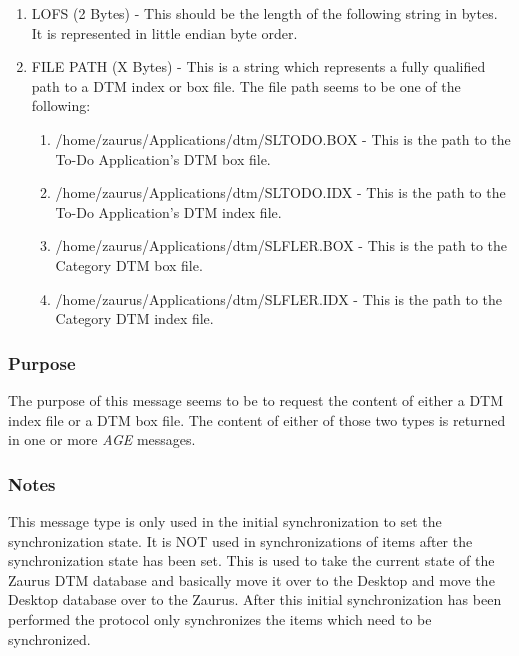             \begin{enumerate}
              \item LOFS (2 Bytes) - This should be the length of the
              following string in bytes. It is represented in little endian
              byte order.

              \item FILE PATH (X Bytes) - This is a string which represents a
              fully qualified path to a DTM index or box file. The file path
              seems to be one of the following:

              \begin{enumerate}
                \item /home/zaurus/Applications/dtm/SLTODO.BOX - This is the
                path to the To-Do Application's DTM box file.

                \item /home/zaurus/Applications/dtm/SLTODO.IDX - This is the
                path to the To-Do Application's DTM index file.

                \item /home/zaurus/Applications/dtm/SLFLER.BOX - This is the
                path to the Category DTM box file.

                \item /home/zaurus/Applications/dtm/SLFLER.IDX - This is the
                path to the Category DTM index file.
              \end{enumerate}
            \end{enumerate}

            \subsubsection{Purpose}

            The purpose of this message seems to be to request the content of
            either a DTM index file or a DTM box file. The content of either
            of those two types is returned in one or more \emph{AGE} messages.

            \subsubsection{Notes}

            This message type is only used in the initial synchronization to
            set the synchronization state. It is NOT used in synchronizations
            of items after the synchronization state has been set. This is
            used to take the current state of the Zaurus DTM database and
            basically move it over to the Desktop and move the Desktop
            database over to the Zaurus. After this initial synchronization
            has been performed the protocol only synchronizes the items which
            need to be synchronized.

